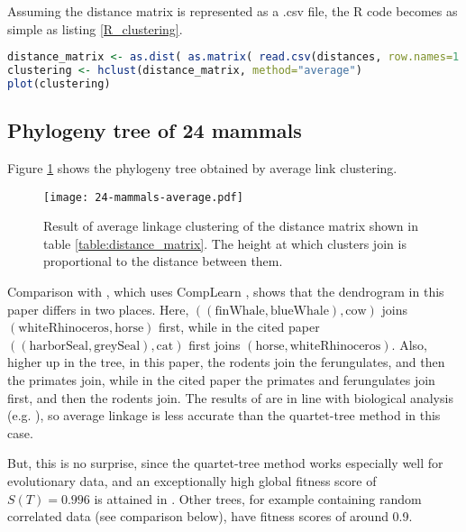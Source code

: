 Assuming the distance matrix is represented as a .csv file, the R code becomes as simple as listing \ref{R_clustering}.

\begin{lstlisting}[language=R, frame=single, caption={R code for plotting a hierarchical clustering. \lstinline{method} can be set to \lstinline{"average"}, \lstinline{"single"} or \lstinline{"complete"}, among other options. }, label=R_clustering]
distance_matrix <- as.dist( as.matrix( read.csv(distances, row.names=1 ) ) )
clustering <- hclust(distance_matrix, method="average")
plot(clustering)
\end{lstlisting}
\subsection{Phylogeny tree of 24 mammals}

Figure \ref{figure:dendrogram_mammals} shows the phylogeny tree obtained by average link clustering.

\begin{figure}[h!]
  \texttt{[image: 24-mammals-average.pdf]}
  \caption{Result of average linkage clustering of the distance matrix shown in table \ref{table:distance_matrix}. The height at which clusters join is proportional to the distance between them. }
  \label{figure:dendrogram_mammals}
\end{figure}

Comparison with \cite{Cilibrasi2005}, which uses CompLearn \cite{CompLearn}, shows that the dendrogram in this paper differs in two places. Here, $((\text{finWhale}, \text{blueWhale}), \text{cow})$ joins $(\text{whiteRhinoceros}, \text{horse})$ first, while in the cited paper $((\text{harborSeal}, \text{greySeal}), \text{cat})$ first joins $(\text{horse}, \text{whiteRhinoceros})$. Also, higher up in the tree, in this paper, the rodents join the ferungulates, and then the primates join, while in the cited paper the primates and ferungulates join first, and then the rodents join. The results of \cite{Cilibrasi2005} are in line with biological analysis (e.g. \cite{Cao1998}), so average linkage is less accurate than the quartet-tree method in this case.

But, this is no surprise, since the quartet-tree method \cite{Cilibrasi2011} works especially well for evolutionary data, and an exceptionally high global fitness score of $S(T) = 0.996$ is attained in \cite{Cilibrasi2005}. Other trees, for example containing random correlated data (see comparison below), have fitness scores of around 0.9.

